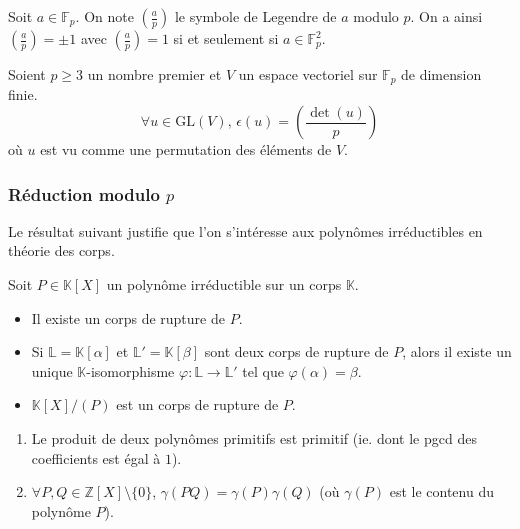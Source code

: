 	
	\begin{notation}
		Soit $a \in \mathbb{F}_p$. On note $\left( \frac{a}{p} \right)$ le symbole de Legendre de $a$ modulo $p$. On a ainsi $\left( \frac{a}{p} \right) = \pm 1$ avec $\left( \frac{a}{p} \right) = 1$ si et seulement si $a \in \mathbb{F}_p^2$.
	\end{notation}
	
	\begin{application}
		Soient $p \geq 3$ un nombre premier et $V$ un espace vectoriel sur $\mathbb{F}_p$ de dimension finie.
		\[ \forall u \in \mathrm{GL}(V), \, \epsilon(u) = \left( \frac{\det(u)}{p} \right) \]
		où $u$ est vu comme une permutation des éléments de $V$.
	\end{application}
	
	\subsubsection{Réduction modulo \texorpdfstring{$p$}{p}}
	
	Le résultat suivant justifie que l'on s'intéresse aux polynômes irréductibles en théorie des corps.
	
	
	\begin{theorem}
		Soit $P \in \mathbb{K}[X]$ un polynôme irréductible sur un corps $\mathbb{K}$.
		\begin{itemize}
			\item Il existe un corps de rupture de $P$.
			\item Si $\mathbb{L} = \mathbb{K}[\alpha]$ et $\mathbb{L}' = \mathbb{K}[\beta]$ sont deux corps de rupture de $P$, alors il existe un unique $\mathbb{K}$-isomorphisme $\varphi : \mathbb{L} \rightarrow \mathbb{L}'$ tel que $\varphi(\alpha) = \beta$.
			\item $\mathbb{K}[X]/(P)$ est un corps de rupture de $P$.
		\end{itemize}
	\end{theorem}
	
	
	\begin{lemma}[Gauss]
		\begin{enumerate}[label=(\roman*)]
			\item Le produit de deux polynômes primitifs est primitif (ie. dont le pgcd des coefficients est égal à $1$).
			\item $\forall P, Q \in \mathbb{Z}[X] \setminus \{ 0 \}$, $\gamma(PQ) = \gamma(P) \gamma(Q)$ (où $\gamma(P)$ est le contenu du polynôme $P$).
		\end{enumerate}
	\end{lemma}
	
